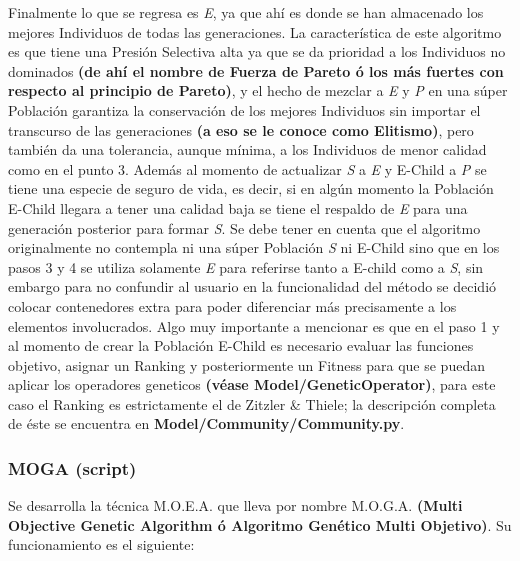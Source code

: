 \documentclass[class=report, crop=false]{standalone}
\begin{document}
Finalmente lo que se regresa es \emph{E}, ya que ahí es 
donde se han almacenado los mejores Individuos de todas 
las generaciones.\medskip\break
La característica de este algoritmo es que tiene una 
Presión Selectiva alta ya que se da prioridad a los 
Individuos no dominados \textbf{(de ahí el nombre de Fuerza de Pareto ó los más fuertes con respecto al principio de Pareto)},
y el hecho de mezclar a \emph{E} y \emph{P} en una 
súper Población garantiza la conservación de los mejores 
Individuos sin importar el transcurso de las generaciones \textbf{(a eso se le conoce como Elitismo)}, 
pero también da una tolerancia, aunque mínima, a los Individuos 
de menor calidad como en el punto 3.\break
Además al momento de actualizar \emph{S} a \emph{E} y 
E-Child a \emph{P} se tiene una especie de seguro de vida, 
es decir, si en algún momento la Población E-Child llegara a
tener una calidad baja se tiene el respaldo de \emph{E} 
para una generación posterior para formar \emph{S}.\medskip\break
Se debe tener en cuenta que el algoritmo originalmente no 
contempla ni una súper Población \emph{S} ni E-Child 
sino que en los pasos 3 y 4 se utiliza solamente \emph{E} 
para referirse tanto a E-child como a \emph{S}, sin embargo 
para no confundir al usuario en la funcionalidad del método 
se decidió colocar contenedores extra para poder diferenciar 
más precisamente a los elementos involucrados.\medskip\break
Algo muy importante a mencionar es que en el paso 1 y al momento 
de crear la Población E-Child es necesario evaluar las funciones 
objetivo, asignar un Ranking y posteriormente un Fitness para 
que se puedan aplicar los operadores geneticos \textbf{(véase Model/GeneticOperator)}, 
para este caso el Ranking es estrictamente el de Zitzler \& Thiele; 
la descripción completa de éste se encuentra en 
\textbf{Model/Community/Community.py}.

\subsubsection{MOGA (script)}
\label{sec:a_2_6_3}
Se desarrolla la técnica M.O.E.A. que lleva por 
nombre M.O.G.A. \textbf{(Multi Objective Genetic Algorithm ó Algoritmo Genético Multi Objetivo)}.\break
Su funcionamiento es el siguiente:
\end{document}

